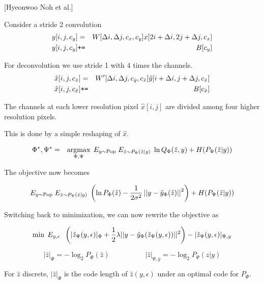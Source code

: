 {\centerline{\Large [Hyeonwoo Noh et al.]}




Consider a stride 2 convolution
\begin{eqnarray*}
  y[i,j,c_y] & = &   W[\Delta i, \Delta j, c_x, c_y] x[2i + \Delta i, 2j + \Delta j, c_x] \\
  y[i,j,c_y] & \mbox{\tt +=} & B[c_y]
\end{eqnarray*}

\vfill
For deconvolution we use stride 1 with 4 times the channels.
\begin{eqnarray*}
  \hat{x}[i,j,c_{\hat{x}}] & = &   W'[\Delta i, \Delta j, c_{\hat{y}}, c_{\hat{x}}] \hat{y}[i + \Delta i, j + \Delta j, c_{\hat{x}}] \\
  \hat{x}[i,j,c_{\hat{x}}] & \mbox{\tt +=} & B[c_{\hat{x}}]
\end{eqnarray*}

\vfill
The channels at each lower resolution pixel $\hat{x}[i,j]$ are divided among four higher resolution pixels.

\vfill
This is done by a simple reshaping of $\hat{x}$.


\begin{eqnarray*}
\Phi^*,\Psi^* & = & \operatorname*{argmax}_{\Phi,\Psi}\; E_{y \sim \mathrm{Pop}}\; E_{\hat{z} \sim P_\Psi(\hat{z}|y)}\;\ln Q_\Phi(\hat{z},y) + H(P_\Psi(\hat{z}|y))
\end{eqnarray*}

\vfill
The objective now becomes

\vfill
$$E_{y \sim \mathrm{Pop}}\;E_{\hat{z}\sim P_\Psi(\hat{z}|y)}\;\left(\ln P_\Phi(\hat{z}) - \frac{1}{2\sigma^2}\left|\left|y - \hat{y}_\Phi(\hat{z})\right|\right|^2\right) + H(P_\Psi(\hat{z}|y))$$


Switching back to minimization, we can now rewrite the objective as

\vfill
$$\min \; E_{y,\epsilon}\;\;\left(|\hat{z}_\Psi(y,\epsilon)|_\Phi +  \frac{1}{2}\lambda||y - \hat{y}_\Phi(\hat{z}_\Psi(y,\epsilon))||^2\right) - |\hat{z}_\Psi(y,\epsilon)|_{\Psi,y}$$

\vfill
$$|\hat{z}|_\Phi  = - \log_2 P_\Phi(\hat{z})\hspace{5em} |\hat{z}|_{\Psi,y}  = - \log_2 P_\Psi(\hat{z}|y)$$

\vfill
For $\hat{z}$ discrete, $|\hat{z}|_\Phi$ is the code length of $\hat{z}(y,\epsilon)$ under an optimal code for $P_\Phi$.

}
